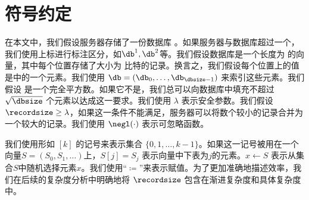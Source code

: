 \section{符号约定}
在本文中，我们假设服务器\server 存储了一份数据库 \db。如果服务器与数据库超过一个，我们使用上标进行标注区分，如$\db^{1},\db^{2}$等。我们假设数据库是一个长度为 \dbsize 的向量，其中每个位置存储了大小为 \recordsize 比特的记录。换言之，我们假设每个位置上的值是\recordfield 中的一个元素。我们使用 $\db = (\db_0,\dots,\db_{\dbsize-1})$ 来索引这些元素。我们假设 \dbsize 是一个完全平方数。如果它不是，我们总可以向数据库中填充不超过 $\sqrt{\dbsize}$ 个元素以达成这一要求。我们使用 $\lambda$ 表示安全参数。我们假设$\recordsize \ge \lambda$，如果这一条件不能满足，服务器可以将数个较小的记录合并为一个较大的记录。我们使用 $\negl(\cdot)$ 表示可忽略函数。

我们使用形如 $[k]$ 的记号来表示集合 $\{0,1,\dots,k-1\}$。如果这一记号被用在一个向量$S = (S_0, S_1, \dots)$上，$S[j]=S_j$ 表示向量中下表为$j$的元素。$x\leftarrow S$ 表示从集合$S$中随机选择元素$x$。我们使用``$\coloneqq$''来表示赋值。为了更加准确地描述效率，我们在后续的复杂度分析中明确地将 $\recordsize$ 包含在渐进复杂度和具体复杂度中。
